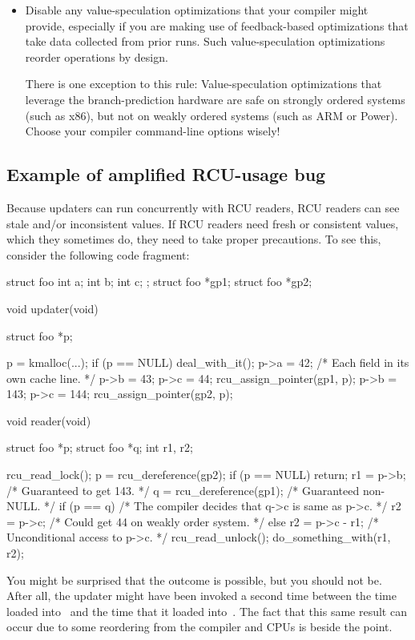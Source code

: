 \begin{itemize}
\item	Disable any value-speculation optimizations that your compiler
	might provide, especially if you are making use of feedback-based
	optimizations that take data collected from prior runs.
	Such
	value-speculation optimizations reorder operations by design.

	There is one exception to this rule:
	Value-speculation
	optimizations that leverage the branch-prediction hardware are
	safe on strongly ordered systems (such as x86), but not on weakly
	ordered systems (such as ARM or Power).
	Choose your compiler
	command-line options wisely!
\end{itemize}

\subsection{Example of amplified RCU-usage bug}
\label{sec:rcu:Example of amplified RCU-usage bug}

Because updaters can run concurrently with RCU readers, RCU readers can
see stale and/or inconsistent values.
If RCU readers need fresh or
consistent values, which they sometimes do, they need to take proper
precautions.
To see this, consider the following code fragment:

\begin{VerbatimU}[samepage=false]
	struct foo {
		int a;
		int b;
		int c;
	};
	struct foo *gp1;
	struct foo *gp2;

	void updater(void)
	{
		struct foo *p;

		p = kmalloc(...);
		if (p == NULL)
			deal_with_it();
		p->a = 42;  /* Each field in its own cache line. */
		p->b = 43;
		p->c = 44;
		rcu_assign_pointer(gp1, p);
		p->b = 143;
		p->c = 144;
		rcu_assign_pointer(gp2, p);
	}

	void reader(void)
	{
		struct foo *p;
		struct foo *q;
		int r1, r2;

		rcu_read_lock();
		p = rcu_dereference(gp2);
		if (p == NULL)
			return;
		r1 = p->b;  /* Guaranteed to get 143. */
		q = rcu_dereference(gp1);  /* Guaranteed non-NULL. */
		if (p == q) {
			/* The compiler decides that q->c is same as p->c. */
			r2 = p->c; /* Could get 44 on weakly order system. */
		} else {
			r2 = p->c - r1; /* Unconditional access to p->c. */
		}
		rcu_read_unlock();
		do_something_with(r1, r2);
	}
\end{VerbatimU}

You might be surprised that the outcome  is possible,
but you should not be.
After all, the updater might have been invoked
a second time between the time  loaded into~ and the time
that it loaded into~.
The fact that this same result can occur due
to some reordering from the compiler and CPUs is beside the point.

